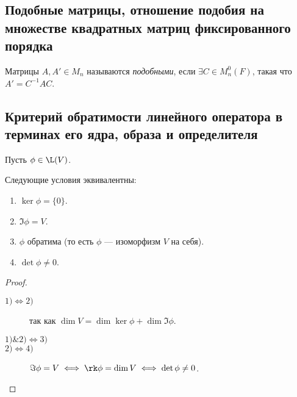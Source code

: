 \begin{comment}
    $\det A$ и $\tr A$ являются инвариантами самого линейного оператора $\phi$.

    Обозначаются: $\det \phi$, $\tr \phi$.
\end{comment}


\subsection{Подобные матрицы, отношение подобия на множестве квадратных матриц фиксированного порядка}

\begin{definition}
    Матрицы $A, A' \in M_n$ называются \textit{подобными}, если $\exists C \in M_n^{0}(F)$, такая что $A' = C^{-1} A C$.
\end{definition}

\begin{comment}
    Отношение подобия является отношением эквивалентности на $M_n(F)$.

    $M_n(F)$ разбивается на классы подобных матриц.
\end{comment}


\subsection{Критерий обратимости линейного оператора в терминах его ядра, образа и определителя}

Пусть $\phi \in \L(V)$.

\begin{proposal}
    Следующие условия эквивалентны:
    \begin{enumerate}[nosep]
    \item $\ker \phi = \{0\}$.
    \item $\Im \phi = V$.
    \item $\phi$ обратима (то есть $\phi$ --- изоморфизм $V$ на себя).
    \item $\det \phi \neq 0$.
    \end{enumerate}
\end{proposal}

\begin{proof}~
    \begin{description}
        \item[$1) \iff 2)$] так как $\dim V = \dim \ker \phi + \dim \Im \phi$. 
        \item[$1) \& 2) \iff 3)$]
        \item[$2) \iff 4)$] $\Im \phi = V \iff \rk \phi = \dim V \iff \det \phi \neq 0$.
    \end{description}
\end{proof}

